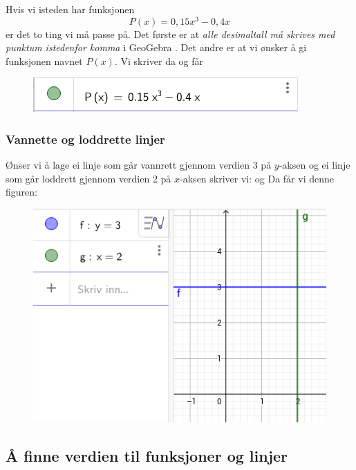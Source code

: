 Hvis vi isteden har funksjonen
\[ P(x)= 0,15x^3 - 0,4 x\]
er det to ting vi må passe på. Det første er at \textsl{alle desimaltall må skrives med punktum istedenfor komma} i GeoGebra
. Det andre er at vi ønsker å gi funksjonen navnet $ P(x) $. Vi skriver da
og får \vspace{-5pt}
\begin{figure}[H]
	\centering
	\includegraphics[scale=0.5]{pfig}
\end{figure}

\subsubsection{Vannette og loddrette linjer}

Ønser vi å lage ei linje som går vannrett gjennom verdien 3 på $ y $-aksen og ei linje som går loddrett gjennom verdien 2 på $ x $-aksen skriver vi:
og 
Da får vi denne figuren:
\begin{figure}[H]
	\centering
	\includegraphics[scale=0.5]{23}
\end{figure}

\subsection{Å finne verdien til funksjoner og linjer}
